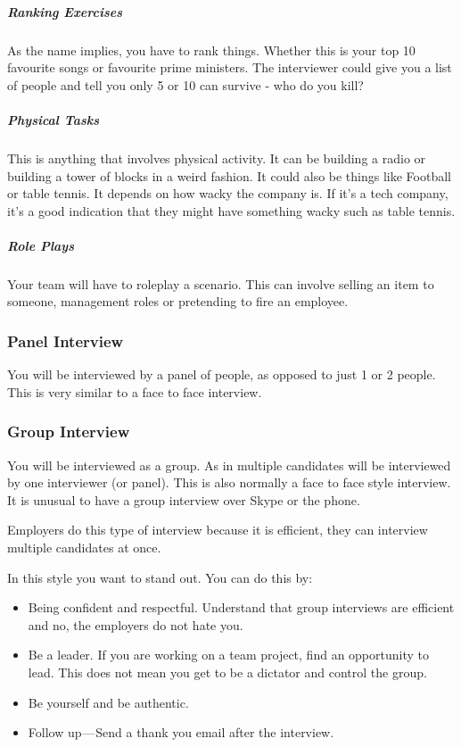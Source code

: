 \documentclass{article}
\begin{document}
\subparagraph{Ranking Exercises}
As the name implies, you have to rank things. Whether this is your top
10 favourite songs or favourite prime ministers. The interviewer could
give you a list of people and tell you only 5 or 10 can survive - who do
you kill?

\subparagraph{Physical Tasks}
This is anything that involves physical activity. It can be building a
radio or building a tower of blocks in a weird fashion. It could also be
things like Football or table tennis. It depends on how wacky the
company is. If it's a tech company, it's a good indication that they
might have something wacky such as table tennis.

\subparagraph{Role Plays}
Your team will have to roleplay a scenario. This can involve selling an
item to someone, management roles or pretending to fire an employee.

\subsubsection{Panel Interview}
You will be interviewed by a panel of people, as opposed to just 1 or 2
people. This is very similar to a face to face interview.
\subsubsection{Group Interview}
You will be interviewed as a group. As in multiple candidates will be
interviewed by one interviewer (or panel). This is also normally a face
to face style interview. It is unusual to have a group interview over
Skype or the phone.

Employers do this type of interview because it is efficient, they can
interview multiple candidates at once.

In this style you want to stand out. You can do this by:

\begin{itemize}
\item
  Being confident and respectful. Understand that group interviews are
  efficient and no, the employers do not hate you.
\item
  Be a leader. If you are working on a team project, find an opportunity
  to lead. This does not mean you get to be a dictator and control the
  group.
\item
  Be yourself and be authentic.
\item
  Follow up --- Send a thank you email after the interview.
\end{itemize}
\end{document}
